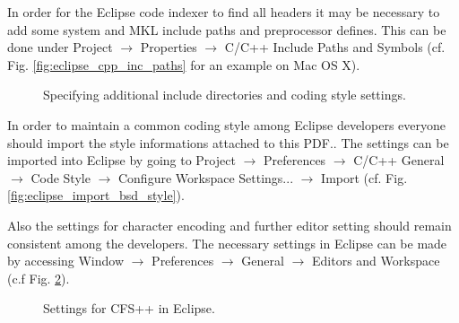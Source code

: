 In order for the Eclipse code indexer  to find all headers it may be necessary
to add some  system and MKL include paths and  preprocessor defines.  This can
be  done under  Project $\rightarrow$  Properties $\rightarrow$  C/C++ Include
Paths and Symbols (cf.  Fig. \ref{fig:eclipse_cpp_inc_paths} for an example on
Mac OS X).

\begin{figure}[htb] 
  \centering 
  \qquad
  \caption{Specifying additional include directories and coding style settings.}
  \label{fig:eclipse_code_style_inc}
\end{figure}

In order to  maintain a common coding style  among Eclipse developers everyone
should     import    the     style    informations     attached     to    this
PDF.. The settings
can be  imported into  Eclipse by going  to Project  $\rightarrow$ Preferences
$\rightarrow$ C/C++  General $\rightarrow$ Code  Style $\rightarrow$ Configure
Workspace             Settings...              $\rightarrow$            Import
(cf. Fig. \ref{fig:eclipse_import_bsd_style}).

Also the  settings for  character encoding and  further editor  setting should
remain consistent among the developers.  The necessary settings in Eclipse can
be made  by accessing  Window $\rightarrow$ Preferences  $\rightarrow$ General
$\rightarrow$ Editors and Workspace (c.f Fig. \ref{fig:eclipse_cfs_settings}).
\begin{figure}[htb] 
  \centering 
  \qquad
  \caption{Settings for CFS++ in Eclipse.}
  \label{fig:eclipse_cfs_settings}
\end{figure}

